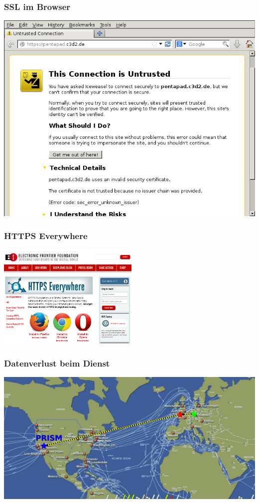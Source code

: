 \documentclass[12pt]{beamer}
\begin{document}
\begin{frame}
    \frametitle{SSL im Browser}
    \begin{center}
	\includegraphics[height=0.7\textheight]{img/ssl_unverified.png}
    \end{center}
\end{frame}

\begin{frame}
  \frametitle{HTTPS Everywhere}
    \begin{center}
      \includegraphics[height=5cm]{img/https-everywhere.png}
    \end{center}
\end{frame}

\begin{frame}
    \frametitle{Datenverlust beim Dienst}
    \begin{center}
      \includegraphics[height=0.7\textheight]{img/internetmap-abhoeren-prism-ssl}
    \end{center}
\end{frame}
\end{document}
